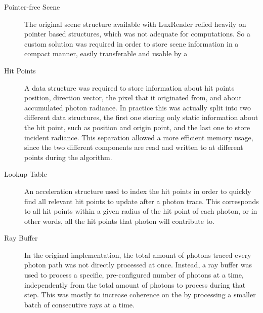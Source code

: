 \documentclass[main.tex]{subfiles}
\begin{document}
\begin{description}
\item[Pointer-free Scene] The original scene structure available with LuxRender relied heavily on pointer based structures, which was not adequate for \gpu computations. So a custom solution was required in order to store scene information in a compact manner, easily transferable and usable by a \gpu

\item[Hit Points] A data structure was required to store information about hit points position, direction vector, the pixel that it originated from, and about accumulated photon radiance. In practice this was actually split into two different data structures, the first one storing only static information about the hit point, such as position and origin point, and the last one to store incident radiance. This separation allowed a more efficient memory usage, since the two different components are read and written to at different points during the algorithm.

\item[Lookup Table] An acceleration structure used to index the hit points in order to quickly find all relevant hit points to update after a photon trace. This corresponds to all hit points within a given radius of the hit point of each photon, or in other words, all the hit points that photon will contribute to.

\item[Ray Buffer] In the original implementation, the total amount of photons traced every photon path was not directly processed at once. Instead, a ray buffer was used to process a specific, pre-configured number of photons at a time, independently from the total amount of photons to process during that step. This was mostly to increase coherence on the \cpu by processing a smaller batch of consecutive rays at a time.

\end{description}
\end{document}
